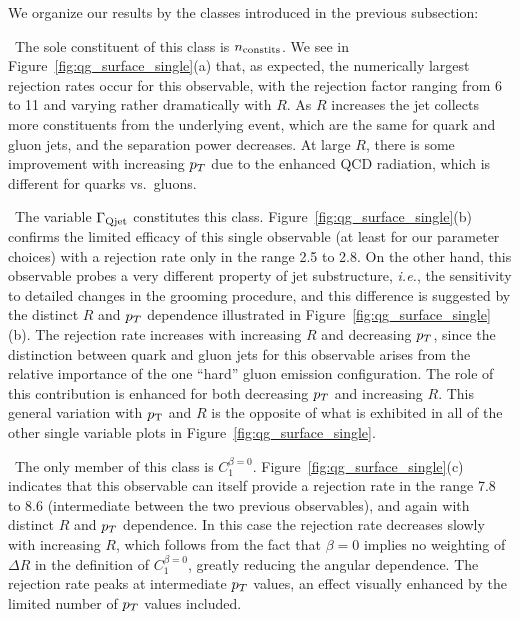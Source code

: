  We organize our results by the classes introduced in the previous subsection:

~The sole constituent of this class is $n_{\rm constits}$. We see in  Figure~\ref{fig:qg_surface_single}(a) that, as expected,  the numerically largest rejection rates occur
for this observable, with the rejection factor ranging from 6 to 11 and 
varying rather dramatically with $R$.  As $R$ increases the jet collects more constituents from the underlying event, which are the same
for quark and gluon jets, and the separation power decreases.  At large $R$, there is some improvement with increasing $p_T$ due to the 
enhanced QCD radiation, which is different for quarks vs.~gluons.  

~The variable $\Gamma_{\rm Qjet}$ constitutes this class. Figure~\ref{fig:qg_surface_single}(b) confirms the 
limited efficacy of this single
observable (at least for our parameter choices) with a rejection rate only in the range 2.5 to 2.8.  On the other hand, this 
observable probes a very different
property of jet substructure, \textit{i.e.}, the sensitivity to detailed changes in the grooming procedure, and this difference is suggested
by the distinct $R$ and $p_T$ dependence illustrated in  Figure~\ref{fig:qg_surface_single}(b).  The rejection rate increases with increasing $R$
and decreasing $p_T$, since the distinction between quark and gluon jets for this observable arises from the relative importance of the one
``hard'' gluon emission configuration.  The role of this contribution is enhanced for both decreasing $p_T$ and increasing $R$. 
This general variation with $p_{\mathrm{T}}$ and $R$ is the opposite of what is exhibited in all of the other single variable plots in Figure~\ref{fig:qg_surface_single}.


~The only member of this class is $C_1^{\beta=0}$. Figure~\ref{fig:qg_surface_single}(c) indicates that this observable  can itself provide a rejection rate in the range
7.8 to 8.6 (intermediate between the two previous observables), and again with distinct $R$ and $p_T$ dependence.  In this case the rejection
rate decreases slowly with increasing $R$, which follows from the fact that $\beta = 0$ implies no weighting of $\Delta R$ in the definition of $C_1^{\beta=0}$, greatly reducing 
the angular dependence.
The rejection rate peaks at intermediate $p_T$ values, an effect visually enhanced by the limited number of 
$p_T$ values included.  


